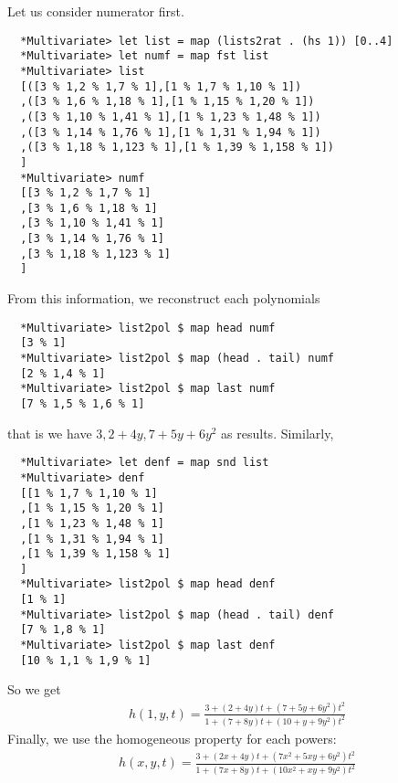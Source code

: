 \documentclass[11pt]{book}
\begin{document}
Let us consider numerator first.
\begin{verbatim}
  *Multivariate> let list = map (lists2rat . (hs 1)) [0..4]
  *Multivariate> let numf = map fst list
  *Multivariate> list
  [([3 % 1,2 % 1,7 % 1],[1 % 1,7 % 1,10 % 1])
  ,([3 % 1,6 % 1,18 % 1],[1 % 1,15 % 1,20 % 1])
  ,([3 % 1,10 % 1,41 % 1],[1 % 1,23 % 1,48 % 1])
  ,([3 % 1,14 % 1,76 % 1],[1 % 1,31 % 1,94 % 1])
  ,([3 % 1,18 % 1,123 % 1],[1 % 1,39 % 1,158 % 1])
  ]
  *Multivariate> numf
  [[3 % 1,2 % 1,7 % 1]
  ,[3 % 1,6 % 1,18 % 1]
  ,[3 % 1,10 % 1,41 % 1]
  ,[3 % 1,14 % 1,76 % 1]
  ,[3 % 1,18 % 1,123 % 1]
  ]
\end{verbatim}
From this information, we reconstruct each polynomials
\begin{verbatim}
  *Multivariate> list2pol $ map head numf
  [3 % 1]
  *Multivariate> list2pol $ map (head . tail) numf
  [2 % 1,4 % 1]
  *Multivariate> list2pol $ map last numf
  [7 % 1,5 % 1,6 % 1]
\end{verbatim}
that is we have $3, 2+4y, 7+5y+6y^2$ as results.
Similarly,
\begin{verbatim}
  *Multivariate> let denf = map snd list
  *Multivariate> denf
  [[1 % 1,7 % 1,10 % 1]
  ,[1 % 1,15 % 1,20 % 1]
  ,[1 % 1,23 % 1,48 % 1]
  ,[1 % 1,31 % 1,94 % 1]
  ,[1 % 1,39 % 1,158 % 1]
  ]
  *Multivariate> list2pol $ map head denf
  [1 % 1]
  *Multivariate> list2pol $ map (head . tail) denf
  [7 % 1,8 % 1]
  *Multivariate> list2pol $ map last denf
  [10 % 1,1 % 1,9 % 1]
\end{verbatim}
So we get
\begin{eqnarray}
h(1,y,t) = \frac{3 + (2+4y)t + (7+5y+6y^2)t^2}{1 + (7+8y)t + (10+y+9y^2)t^2}
\end{eqnarray}
Finally, we use the homogeneous property for each powers:
\begin{eqnarray}
h(x,y,t) = \frac{3 + (2x+4y)t + (7x^2+5xy+6y^2)t^2}{1 + (7x+8y)t + (10x^2+xy+9y^2)t^2}
\end{eqnarray}
\end{document}
